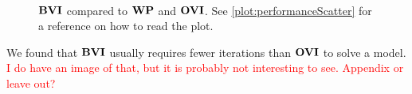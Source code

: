 \begin{figure}[h!]
    \centering
    \
    \caption{$\mathbf{BVI}$ compared to $\mathbf{WP}$ and $\mathbf{OVI}$. See \ref{plot:performanceScatter} for a reference on how to read the plot.}%
    \label{fig:BVIvsWPvsOVI}%
    \end{figure}
\FloatBarrier

We found that $\mathbf{BVI}$ usually requires fewer iterations than $\mathbf{OVI}$ to solve a model. 
\textcolor{red}{I do have an image of that, but it is probably not interesting to see. Appendix or leave out?}

